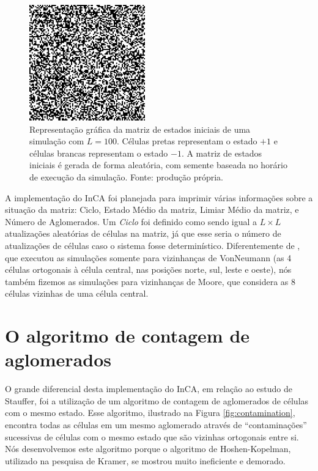 \documentclass[
	12pt,				%
	openright,			%
	twoside,			%
	a4paper,			%
	english,			%
	french,				%
	spanish,			%
	brazil				%
	]{abntex2}
\begin{document}
\begin{figure}
    \centering
    \includegraphics[width=5cm]{matrizL100Ciclo0.png}
    \caption{Representação gráfica da matriz de estados iniciais de uma simulação com $L=100$. Células pretas representam o estado $+1$ e células brancas representam o estado $-1$. A matriz de estados iniciais é gerada de forma aleatória, com semente baseada no horário de execução da simulação. Fonte: produção própria.}
    \label{fig:matrizL100Ciclo0}
\end{figure}

A implementação do InCA foi planejada para imprimir várias informações sobre a situação da matriz: Ciclo, Estado Médio da matriz, Limiar Médio da matriz, e Número de Aglomerados. Um \textit{Ciclo} foi definido como sendo igual a $L\times L$ atualizações aleatórias de células na matriz, já que esse seria o número de atualizações de células caso o sistema fosse determinístico. Diferentemente de , que executou as simulações somente para vizinhanças de VonNeumann (as 4 células ortogonais à célula central, nas posições norte, sul, leste e oeste), nós também fizemos as simulações para vizinhanças de Moore, que considera as 8 células vizinhas de uma célula central.

\section{O algoritmo de contagem de aglomerados}

O grande diferencial desta implementação do InCA, em relação ao estudo de Stauffer, foi a utilização de um algoritmo de contagem de aglomerados de células com o mesmo estado. Esse algoritmo, ilustrado na Figura \ref{fig:contamination}, encontra todas as células em um mesmo aglomerado através de ``contaminações'' sucessivas de células com o mesmo estado que são vizinhas ortogonais entre si. Nós desenvolvemos este algoritmo porque o algoritmo de Hoshen-Kopelman, utilizado na pesquisa de Kramer, se mostrou muito ineficiente e demorado.
\end{document}
